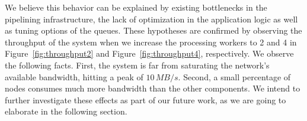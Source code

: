 We believe this behavior can be explained by existing bottlenecks in the pipelining infrastructure, the lack of optimization in the application logic as well as tuning options of the \zmq{} queues.
These hypotheses are confirmed by observing the throughput of the system when we increase the processing workers to 2 and 4 in Figure~\ref{fig:throughput2} and Figure~\ref{fig:throughput4}, respectively.
We observe the following facts.
First, the system is far from saturating the network's available bandwidth, hitting a peak of $10\,MB/s$.
Second, a small percentage of nodes consumes much more bandwidth than the other components.
We intend to further investigate these effects as part of our future work, as we are going to elaborate in the following section.


